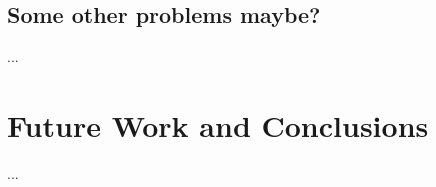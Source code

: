\documentclass[english, a4paper, 12pt, twoside]{article}
\numberwithin{equation}{section} %
\begin{document}
\subsection{Some other problems maybe?}
...

\newpage
\section{Future Work and Conclusions}
...


\appendix


\end{document}
